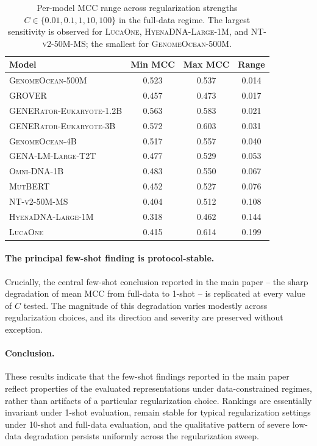 \documentclass{llmxive}
\begin{document}
\begin{table}[!htbp]
\centering
\small
\begin{tabular}{@{}lccc@{}}
\toprule
\textbf{Model} & \textbf{Min MCC} & \textbf{Max MCC} & \textbf{Range} \\
\midrule
\textsc{GenomeOcean-500M}          & 0.523 & 0.537 & 0.014 \\
\textsc{GROVER}                     & 0.457 & 0.473 & 0.017 \\
\textsc{GENERator-Eukaryote-1.2B}  & 0.563 & 0.583 & 0.021 \\
\textsc{GENERator-Eukaryote-3B}    & 0.572 & 0.603 & 0.031 \\
\textsc{GenomeOcean-4B}            & 0.517 & 0.557 & 0.040 \\
\textsc{GENA-LM-Large-T2T}         & 0.477 & 0.529 & 0.053 \\
\textsc{Omni-DNA-1B}                & 0.483 & 0.550 & 0.067 \\
\textsc{MutBERT}                    & 0.452 & 0.527 & 0.076 \\
\textsc{NT-v2-50M-MS}              & 0.404 & 0.512 & 0.108 \\
\textsc{HyenaDNA-Large-1M}         & 0.318 & 0.462 & 0.144 \\
\textsc{LucaOne}                    & 0.415 & 0.614 & 0.199 \\
\bottomrule
\end{tabular}
\caption{Per-model MCC range across regularization strengths
$C \in \{0.01, 0.1, 1, 10, 100\}$ in the full-data regime. The largest
sensitivity is observed for \textsc{LucaOne}, \textsc{HyenaDNA-Large-1M},
and \textsc{NT-v2-50M-MS}; the smallest for \textsc{GenomeOcean-500M}.}
\label{tab:fewshot_ranges}
\end{table}

\paragraph{The principal few-shot finding is protocol-stable.}
Crucially, the central few-shot conclusion reported in the main
paper -- the sharp degradation of mean MCC from full-data to 1-shot -- is
replicated at every value of $C$ tested. The magnitude of this
degradation varies modestly across regularization choices, and its
direction and severity are preserved without exception.

\paragraph{Conclusion.}
These results indicate that the few-shot findings reported in the main
paper reflect properties of the evaluated representations under
data-constrained regimes, rather than artifacts of a particular
regularization choice. Rankings are essentially invariant under 1-shot
evaluation, remain stable for typical regularization settings under
10-shot and full-data evaluation, and the qualitative pattern of severe
low-data degradation persists uniformly across the regularization sweep.
\end{document}

